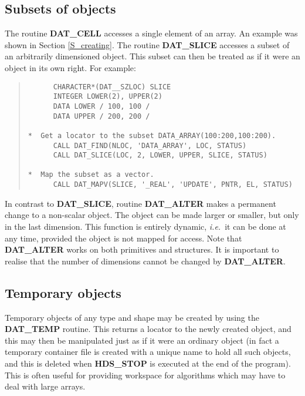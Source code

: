 \subsection{Subsets of objects}

The routine {\bf DAT\_CELL} accesses a single element of an array.
An example was shown in Section \ref{S_creating}.
The routine {\bf DAT\_SLICE} accesses a subset of an arbitrarily dimensioned
object.
This subset can then be treated as if it were an object in its own right.
For example:

\begin{quote}

\begin{small}
\begin{verbatim}
      CHARACTER*(DAT__SZLOC) SLICE
      INTEGER LOWER(2), UPPER(2)
      DATA LOWER / 100, 100 /
      DATA UPPER / 200, 200 /

*  Get a locator to the subset DATA_ARRAY(100:200,100:200).
      CALL DAT_FIND(NLOC, 'DATA_ARRAY', LOC, STATUS)
      CALL DAT_SLICE(LOC, 2, LOWER, UPPER, SLICE, STATUS)

*  Map the subset as a vector.
      CALL DAT_MAPV(SLICE, '_REAL', 'UPDATE', PNTR, EL, STATUS)
\end{verbatim}
\end{small}

\end{quote}
In contrast to {\bf DAT\_SLICE}, routine {\bf DAT\_ALTER} makes a permanent
change to a non-scalar object.
The object can be made larger or smaller, but only in the last dimension.
This function is entirely dynamic, {\em i.e.}\, it can be done at any time,
provided the object is not mapped for access.
Note that {\bf DAT\_ALTER} works on both primitives and structures.
It is important to realise that the number of dimensions cannot be changed by
{\bf DAT\_ALTER}.

\subsection{Temporary objects}

Temporary objects of any type and shape may be created by using the {\bf
DAT\_TEMP} routine.
This returns a locator to the newly created object, and this may then be
manipulated just as if it were an ordinary object (in fact a temporary
container file is created with a unique name to hold all such objects, and this
is deleted when {\bf HDS\_STOP} is executed at the end of the program).
This is often useful for providing workspace for algorithms which may have to
deal with large arrays.

